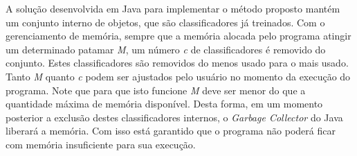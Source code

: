 A solução desenvolvida em Java para implementar o método proposto mantém um conjunto interno de objetos, que são classificadores já treinados. Com o gerenciamento de memória, sempre que a memória alocada pelo programa atingir um determinado patamar \textit{M}, um número \textit{c} de classificadores é removido do conjunto. Estes classificadores são removidos do menos usado para o mais usado. Tanto \textit{M} quanto \textit{c} podem ser ajustados pelo usuário no momento da execução do programa. Note que para que isto funcione \textit{M} deve ser menor do que a quantidade máxima de memória disponível. Desta forma, em um momento posterior a exclusão destes classificadores internos, o \textit{Garbage Collector} do Java liberará a memória. Com isso está garantido que o programa não poderá ficar com memória insuficiente para sua execução.